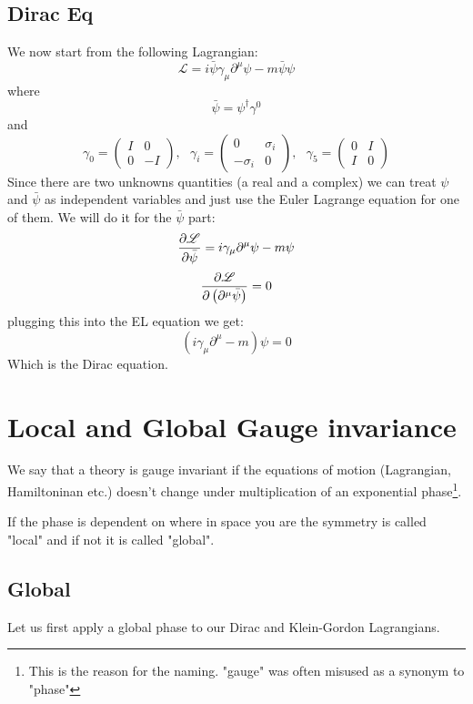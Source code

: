 \documentclass[a4,10pt,titlepage]{article}
\renewcommand\[{\begin{equation*}}
\renewcommand\]{\end{equation*}}
\newcommand{\be}{\begin{equation}}
\newcommand{\ee}{\end{equation}}
\numberwithin{equation}{section}
\newcommand{\lp}{\left}
\newcommand{\rp}{\right}
\newcommand{\Lar}{\mathscr{L}}
\begin{document}
\subsection{Dirac Eq}
We now start from the following Lagrangian:
\be
\Lar=i\bar\psi\gamma_\mu\partial^\mu\psi-m\bar\psi\psi
\ee
where
\be
\bar\psi=\psi^\dagger\gamma^0
\ee
and
\[
\gamma_0=
\begin{pmatrix}
I & 0 \\
0 &-I
\end{pmatrix},\:\:\:\gamma_i=
\begin{pmatrix}
0 & \sigma_i \\
-\sigma_i &0
\end{pmatrix},\:\:\:\gamma_5=
\begin{pmatrix}
0 & I \\
I & 0
\end{pmatrix}
\]
Since there are two unknowns quantities (a real and a complex) we can treat $\psi$ and $\bar\psi$ as independent variables and just use the Euler Lagrange equation for one of them. We will do it for the $\bar\psi$ part:
\[
\pdv{\Lar}{\bar\psi}=i\gamma_\mu\partial^\mu\psi-m\psi
\]
\[
\pdv{\Lar}{\lp(\partial^\mu\bar\psi\rp)}=0
\]
plugging this into the EL equation we get:
\[
\lp(i\gamma_\mu\partial^\mu-m\rp)\psi=0
\]
Which is the Dirac equation.
\section{Local and Global Gauge invariance}
We say that a theory is gauge invariant if the equations of motion (Lagrangian, Hamiltoninan etc.) doesn't change under multiplication of an exponential phase\footnote{This is the reason for the naming. "gauge" was often misused as a synonym to "phase"}. 

If the phase is dependent on where in space you are the symmetry is called "local" and if not it is called "global".
\subsection{Global}
Let us first apply a global phase to our Dirac and Klein-Gordon Lagrangians.
\end{document}
